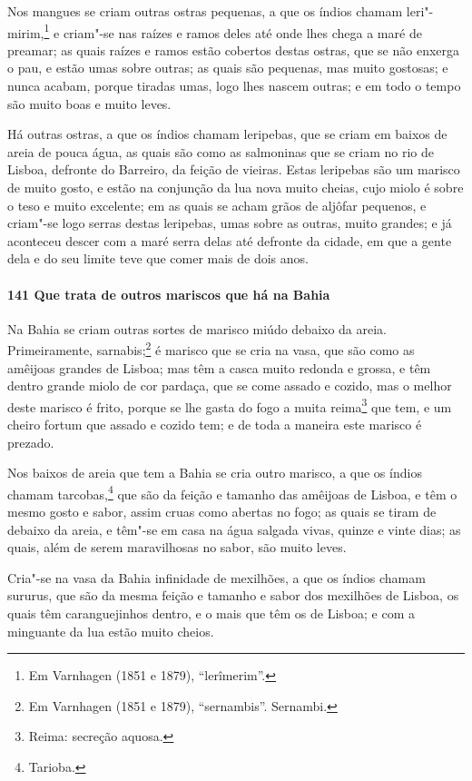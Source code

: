 Nos mangues se criam outras ostras pequenas, a que os índios chamam leri"-mirim,\footnote{
Em Varnhagen (1851 e 1879), ``lerîmerim''.} e criam"-se nas raízes e ramos deles até onde
lhes chega a maré de preamar; as quais raízes e ramos estão cobertos destas ostras, que se
não enxerga o pau, e estão umas sobre outras; as quais são pequenas, mas muito gostosas; e
nunca acabam, porque tiradas umas, logo lhes nascem outras; e em todo o tempo são muito
boas e muito leves.

Há outras ostras, a que os índios chamam leripebas, que se criam em baixos de areia de
pouca água, as quais são como as salmoninas que se criam no rio de Lisboa, defronte do
Barreiro, da feição de vieiras. Estas leripebas são um marisco de muito gosto, e estão na
conjunção da lua nova muito cheias, cujo miolo é sobre o teso e muito excelente; em as
quais se acham grãos de aljôfar pequenos, e criam"-se logo serras destas leripebas, umas
sobre as outras, muito grandes; e já aconteceu descer com a maré serra delas até defronte
da cidade, em que a gente dela e do seu limite teve que comer mais de dois anos.

\paragraph{141 Que trata de outros mariscos que há na Bahia}

Na Bahia se criam outras sortes de marisco miúdo debaixo da areia. Primeiramente,
sarnabis;\footnote{ Em Varnhagen (1851 e 1879), ``sernambis''. Sernambi.} é marisco que se
cria na vasa, que são como as amêijoas grandes de Lisboa; mas têm a casca muito redonda e
grossa, e têm dentro grande miolo de cor pardaça, que se come assado e cozido, mas o
melhor deste marisco é frito, porque se lhe gasta do fogo a muita reima\footnote{ Reima:
secreção aquosa.} que tem, e um cheiro fortum que assado e cozido tem; e de
toda a maneira este marisco é prezado.

Nos baixos de areia que tem a Bahia se cria outro marisco, a que os índios chamam
tarcobas,\footnote{ Tarioba.} que são da feição e tamanho das amêijoas de Lisboa, e têm o
mesmo gosto e sabor, assim cruas como abertas no fogo; as quais se tiram de debaixo da
areia, e têm"-se em casa na água salgada vivas, quinze e vinte dias; as quais, além de
serem maravilhosas no sabor, são muito leves.

Cria"-se na vasa da Bahia infinidade de mexilhões, a que os índios chamam sururus, que são
da mesma feição e tamanho e sabor dos mexilhões de Lisboa, os quais têm caranguejinhos
dentro, e o mais que têm os de Lisboa; e com a minguante da lua estão muito cheios.

